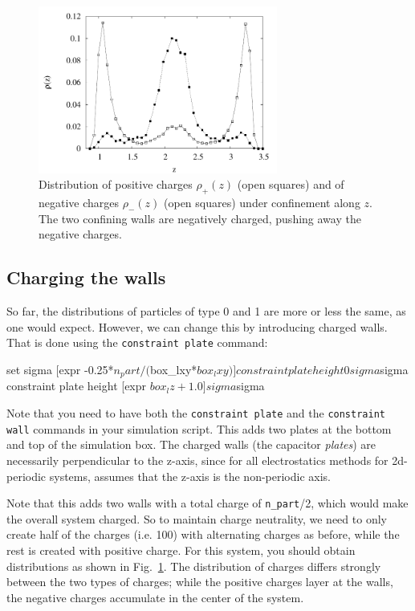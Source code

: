 \documentclass[
a4paper,                        %
11pt,                           %
twoside,                        %
footsepline,                    %
headsepline,                    %
headexclude,                    %
footexclude,                    %
pagesize,                       %
]{scrartcl}
\begin{document}
\begin{figure}[h]
  \centering
  \includegraphics[width=0.7\textwidth]{figures/nonneutral-rho}
  \caption{Distribution of positive charges $\rho_+(z)$ (open squares)
    and of negative charges $\rho_-(z)$ (open squares) under
    confinement along $z$. The two confining walls are negatively
    charged, pushing away the negative charges.}
  \label{fig:nonneutralrho}
\end{figure}

\subsection*{Charging the walls}

So far, the distributions of particles of type 0 and 1 are more or
less the same, as one would expect. However, we can change this by
introducing charged walls. That is done using the
\verb|constraint plate| command:

\begin{tclcode}
  set sigma [expr -0.25*$n_part/($box_lxy*$box_lxy)]
  constraint plate height 0 sigma $sigma
  constraint plate height [expr $box_lz + 1.0] sigma $sigma
\end{tclcode}

Note that you need to have both the \verb|constraint plate| and the 
\verb|constraint wall| commands in your simulation script.
This adds two plates at the bottom and top of the simulation box. The
charged walls (the capacitor \emph{plates}) are necessarily
perpendicular to the z-axis, since for all electrostatics methods for
2d-periodic systems, \es{} assumes that the z-axis is the
non-periodic axis.

Note that
this adds two walls with a total charge of \verb|n_part|/2, which
would make the overall system charged. So to maintain charge
neutrality, we need to only create half of the charges (i.e. 100)
with alternating charges as before, while the rest is created
with positive charge.
For this system, you should obtain distributions as shown in
Fig.~\ref{fig:nonneutralrho}. The distribution of charges differs
strongly between the two types of charges; while the positive charges
layer at the walls, the negative charges accumulate in the center of
the system.
\end{document}
